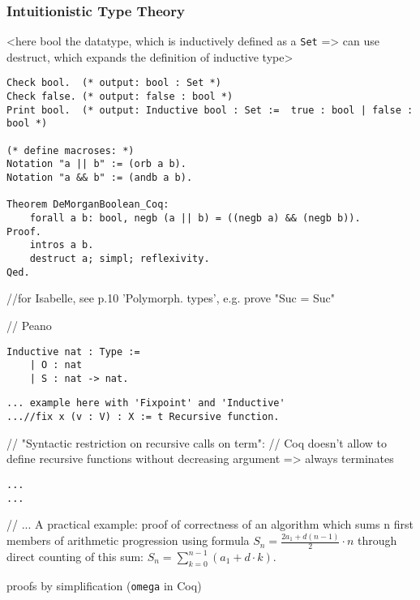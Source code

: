 \documentclass[article]{aaltoseries}
\begin{document}
\subsubsection{Intuitionistic Type Theory}

<here bool the datatype, which is inductively defined as a \texttt{Set} => can use destruct, which expands the definition of inductive type>
\begin{lstlisting}[language=coq,caption={Propositional logic proof: de Morgan's law for booleans},label={Coq:DeMorgan_bool}]
Check bool.  (* output: bool : Set *)
Check false. (* output: false : bool *)
Print bool.  (* output: Inductive bool : Set :=  true : bool | false : bool *)

(* define macroses: *)
Notation "a || b" := (orb a b).
Notation "a && b" := (andb a b).

Theorem DeMorganBoolean_Coq:
    forall a b: bool, negb (a || b) = ((negb a) && (negb b)).
Proof.
    intros a b.
    destruct a; simpl; reflexivity.
Qed.
\end{lstlisting}
//for Isabelle, see p.10 'Polymorph. types', e.g. prove "Suc = Suc" %




// Peano
\begin{lstlisting}[language=coq]
Inductive nat : Type :=
	| O : nat
	| S : nat -> nat.
\end{lstlisting}

\begin{lstlisting}[caption={Recursive function definition: factorial}]
... example here with 'Fixpoint' and 'Inductive'
...//fix x (v : V) : X := t Recursive function.
\end{lstlisting}
// "Syntactic restriction on recursive calls on term":
// Coq doesn't allow to define recursive functions without decreasing argument => always terminates

\begin{lstlisting}[caption={Inductive data type definition: ???}]
...
...
\end{lstlisting}


// ... A practical example: proof of correctness of an algorithm which sums n first members of arithmetic progression using formula $S_{n} = { {\frac {2 a_{1} + d (n - 1)}{2} \cdot n}}$ through direct counting of this sum: $S_{n} = \sum\limits_{k=0}^{n-1} (a_{1} + d \cdot k)$.

proofs by simplification (\texttt{omega} in Coq)
 
\end{document}
